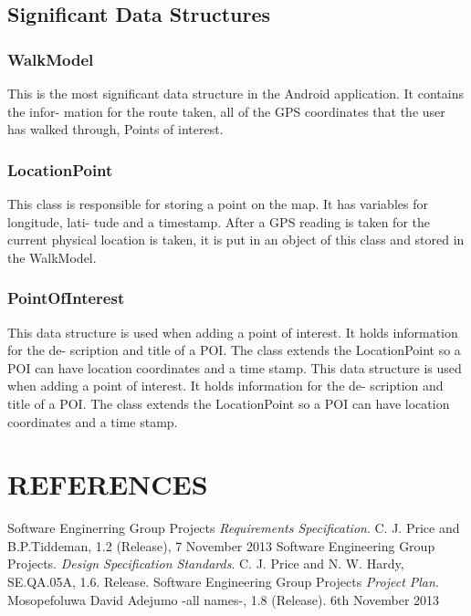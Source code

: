 \documentclass[12pt]{article}
\begin{document}
\subsection{Significant Data Structures}
\subsubsection{WalkModel}
This is the most significant data structure in the Android application. It contains the infor-
mation for the route taken,
all of the GPS coordinates that the user has walked through, Points of interest.
\subsubsection{LocationPoint}
This class is responsible for storing a point on the map. It has variables for longitude, lati-
tude and a timestamp.
After a GPS reading is taken for the current physical location is taken, it is put in an object
of this class and stored in the WalkModel.
\subsubsection{PointOfInterest}
This data structure is used when adding a point of interest. It holds information for the de-
scription and title of a POI.
The class extends the LocationPoint so a POI can have location coordinates and a time
stamp.
This data structure is used when adding a point of interest. It holds information for the de-
scription and title of a POI.
The class extends the LocationPoint so a POI can have location coordinates and a time
stamp.
\newpage 
\section{REFERENCES}
\begin{thebibliography}{0}
  Software Enginerring Group Projects
  \emph{Requirements Specification}.
   C. J. Price and B.P.Tiddeman, 
   1.2 (Release), 
   7 November 2013
Software Engineering Group Projects. 
\emph{Design Specification Standards}.
	C. J. Price and N. W. Hardy, 
	SE.QA.05A,
	1.6. Release.
Software Engineering Group Projects
\emph{ Project Plan}.
Mosopefoluwa David Adejumo -all names-, 1.8
(Release). 6th November 2013
\end{thebibliography}
\newpage
\end{document}
